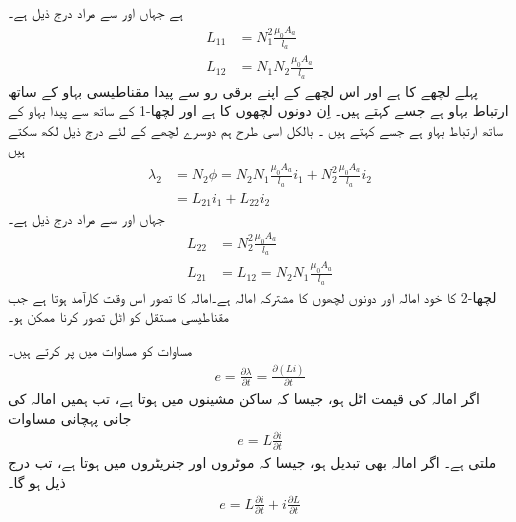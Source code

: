 ہے جہاں  اور  سے مراد درج ذیل ہے۔
\begin{align}
L_{11}&=N_1^2  \frac{\mu_0 A_a}{l_a}\\
L_{12}&=N_1 N_2  \frac{\mu_0 A_a}{l_a}
\end{align}
 پہلے لچھے کا    ہے اور   اس لچھے کے اپنے برقی رو  سے پیدا مقناطیسی بہاو  کے ساتھ  ارتباط بہاو ہے جسے  کہتے ہیں۔  اِن دونوں لچھوں  کا   ہے اور    لچھا-1  کے ساتھ   سے پیدا بہاو کے ساتھ  ارتباط بہاو  ہے جسے   کہتے ہیں ۔ بالکل اسی طرح ہم دوسرے لچھے کے لئے درج ذیل لکھ سکتے ہیں
\begin{align}
\lambda_2&=N_2 \phi=N_2 N_1 \frac{\mu_0 A_a}{l_a} i_1+N_2^2 \frac{\mu_0 A_a}{l_a} i_2  \nonumber \\
&=L_{21} i_1+L_{22} i_2 \label{مساوات_مقناطیسی_دور_دوسرے_لچھے_کی_ارتباط}
\end{align}
جہاں  اور  سے مراد درج ذیل ہے۔
\begin{align}
L_{22}&=N_2^2 \frac{\mu_0 A_a}{l_a}\\
L_{21}&=L_{12}=N_2 N_1 \frac{\mu_0 A_a}{l_a} \label{مساوات_مقناطیسی_دور_مشترکہ_امالہ_یکساں}
\end{align}
 لچھا-2  کا خود امالہ اور   دونوں لچھوں کا مشترکہ امالہ ہے۔امالہ کا تصور اس وقت کارآمد ہوتا ہے جب مقناطیسی مستقل   کو اٹل تصور کرنا ممکن ہو۔

مساوات   کو مساوات   میں پر کرتے ہیں۔
\begin{align}
e=\frac{\partial \lambda}{\partial t}=\frac{\partial \left( L i\right) }{\partial t}
\end{align}
اگر امالہ کی قیمت اٹل ہو، جیسا کہ ساکن مشینوں  میں ہوتا ہے، تب ہمیں  امالہ کی جانی پہچانی مساوات
\begin{align}
e=L \frac{\partial i}{\partial t}
\end{align}
ملتی ہے۔ اگر امالہ بھی تبدیل ہو، جیسا کہ موٹروں اور جنریٹروں میں ہوتا ہے، تب درج ذیل ہو گا۔
\begin{align}
e= L \frac{\partial i}{\partial t} + i \frac{\partial L}{\partial t}
\end{align}

